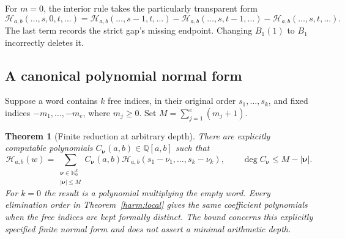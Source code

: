 \documentclass[11pt,a4paper]{article}
\numberwithin{equation}{section}
\newtheorem{theorem}{Theorem}[section]
\theoremstyle{definition}
\theoremstyle{remark}
\begin{document}
For $m=0$, the interior rule takes the particularly transparent form
\begin{equation}
 \mathcal H_{a,b}(\ldots,s,0,t,\ldots)
 =\mathcal H_{a,b}(\ldots,s-1,t,\ldots)
  -\mathcal H_{a,b}(\ldots,s,t-1,\ldots)
  -\mathcal H_{a,b}(\ldots,s,t,\ldots).
 \label{harm:zero}
\end{equation}
The last term records the strict gap's missing endpoint. Changing
$B_1(1)$ to $B_1$ incorrectly deletes it.

\subsection{A canonical polynomial normal form}

Suppose a word contains $k$ free indices, in their original order
$s_1,\ldots,s_k$, and fixed indices $-m_1,\ldots,-m_e$, where
$m_j\ge0$. Set $M=\sum_{j=1}^e(m_j+1)$.

\begin{theorem}[Finite reduction at arbitrary depth]
\label{harm:normalform}
There are explicitly computable polynomials $C_{\boldsymbol\nu}(a,b)
\in\mathbb Q[a,b]$ such that
\begin{equation}
 \boxed{\displaystyle
 \mathcal H_{a,b}(w)=
  \sum_{\substack{\boldsymbol\nu\in\mathbb N_0^k\\
                    |\boldsymbol\nu|\le M}}
  C_{\boldsymbol\nu}(a,b)
  \mathcal H_{a,b}(s_1-\nu_1,\ldots,s_k-\nu_k),\qquad
 \deg C_{\boldsymbol\nu}\le M-|\boldsymbol\nu|.}
 \label{harm:normalform-eq}
\end{equation}
For $k=0$ the result is a polynomial multiplying the empty word.
Every elimination order in Theorem~\ref{harm:local} gives the same
coefficient polynomials when the free indices are kept formally
distinct. The bound concerns this explicitly specified finite normal
form and does not assert a minimal arithmetic depth.
\end{theorem}
\end{document}
